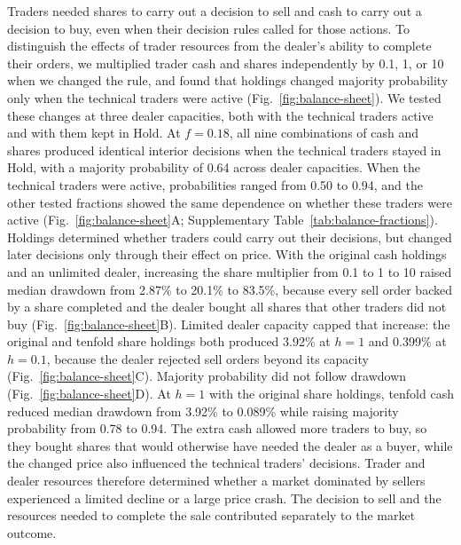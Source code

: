 Traders needed shares to carry out a decision to sell and cash to carry out
a decision to buy, even when their decision rules called for those actions.
To distinguish the effects of trader resources from the dealer's ability to
complete their orders, we multiplied trader cash and shares independently by
0.1, 1, or 10 when we changed the rule, and found that holdings changed
majority probability only when the technical traders were active
(Fig.~\ref{fig:balance-sheet}). We tested these changes at three dealer
capacities, both with the technical traders active and with them kept in
Hold. At $f=0.18$, all nine combinations of cash and shares
produced identical interior decisions when the technical traders stayed in Hold, with
a majority probability of 0.64 across dealer capacities. When the technical traders
were active, probabilities ranged from 0.50 to 0.94, and the other
tested fractions showed the same dependence on whether these traders were
active (Fig.~\ref{fig:balance-sheet}A; Supplementary
Table~\ref{tab:balance-fractions}). Holdings determined whether traders
could carry out their decisions, but changed later decisions only through
their effect on price. With the original cash holdings and an unlimited
dealer, increasing the share multiplier from 0.1 to 1 to 10 raised median
drawdown from 2.87\% to 20.1\% to 83.5\%, because every sell order backed by
a share completed and the dealer bought all shares that other traders did
not buy (Fig.~\ref{fig:balance-sheet}B). Limited dealer capacity capped that
increase: the original and tenfold share holdings both produced 3.92\% at
$h=1$ and 0.399\% at $h=0.1$, because the dealer rejected sell orders beyond
its capacity (Fig.~\ref{fig:balance-sheet}C). Majority probability did not
follow drawdown (Fig.~\ref{fig:balance-sheet}D). At $h=1$ with the original
share holdings, tenfold cash reduced median drawdown from 3.92\% to 0.089\%
while raising majority probability from 0.78 to 0.94. The extra cash allowed
more traders to buy, so they bought shares that would otherwise have needed
the dealer as a buyer, while the changed price also influenced the technical
traders' decisions. Trader and dealer resources therefore determined whether a market
dominated by sellers experienced a limited decline or a large price crash.
The decision to sell and the resources needed to complete the sale
contributed separately to the market outcome.
